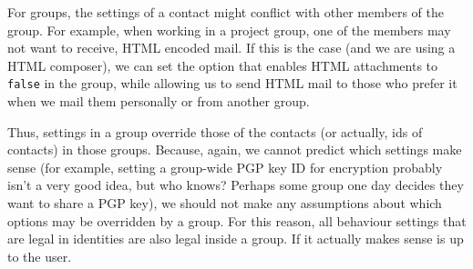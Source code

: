 \documentclass[a4paper]{article}
\begin{document}
For groups, the settings of a contact might conflict with other members
of the group.  For example, when working in a project group, one of the
members may not want to receive, HTML encoded mail.  If this is the
case (and we are using a HTML composer), we can set the option that
enables HTML attachments to \texttt{false} in the group, while allowing
us to send HTML mail to those who prefer it when we mail them personally
or from another group.

Thus, settings in a group override those of the contacts (or actually,
ids of contacts) in those groups.  Because, again, we cannot predict
which settings make sense (for example, setting a group-wide PGP key ID for
encryption probably isn't a very good idea, but who knows?  Perhaps some
group one day decides they want to share a PGP key), we should not make any
assumptions about which options may be overridden by a group.
For this reason, all behaviour settings that are legal in identities are
also legal inside a group.  If it actually makes sense is up to the user.
\end{document}
